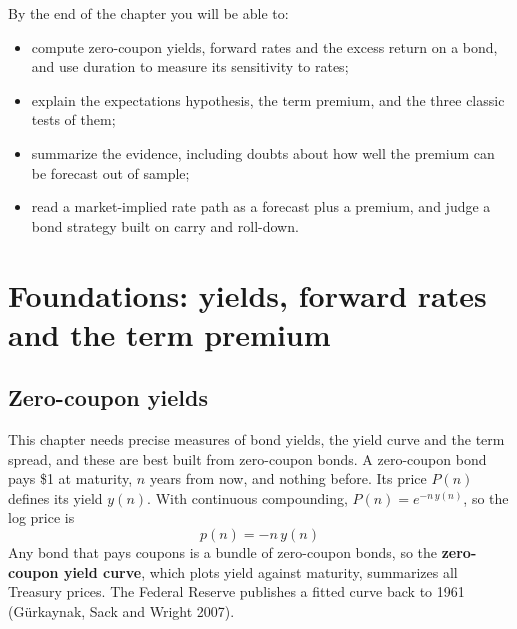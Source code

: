 By the end of the chapter you will be able to:

\begin{itemize}
  \item compute zero-coupon yields, forward rates and the excess return on a bond, and use duration to measure its sensitivity to rates;
  \item explain the expectations hypothesis, the term premium, and the three classic tests of them;
  \item summarize the evidence, including doubts about how well the premium can be forecast out of sample;
  \item read a market-implied rate path as a forecast plus a premium, and judge a bond strategy built on carry and roll-down.
\end{itemize}


\section{Foundations: yields, forward rates and the term premium}
\label{sec:07-foundations}

\subsection{Zero-coupon yields}

This chapter needs precise measures of bond yields, the yield curve and the term spread, and these are best built from zero-coupon bonds. A zero-coupon bond pays \$1 at maturity, $n$ years from now, and nothing before. Its price $P(n)$ defines its yield $y(n)$. With continuous compounding, $P(n) = e^{-n\,y(n)}$, so the log price is
\begin{equation}
  p(n) = -n\,y(n)
  \label{eq:07-logprice}
\end{equation}
Any bond that pays coupons is a bundle of zero-coupon bonds, so the \textbf{zero-coupon yield curve}, which plots yield against maturity, summarizes all Treasury prices. The Federal Reserve publishes a fitted curve back to 1961 (G\"urkaynak, Sack and Wright 2007).


